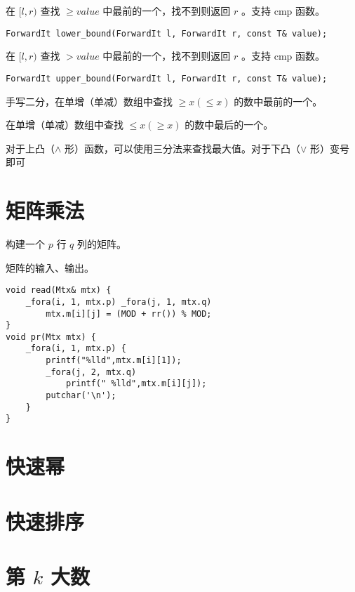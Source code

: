 在 $[l,r)$ 查找 $\geqslant value$ 中最前的一个，找不到则返回 $r$ 。支持 cmp 函数。

\begin{lstlisting}[style=cpp]
ForwardIt lower_bound(ForwardIt l, ForwardIt r, const T& value);
\end{lstlisting}

在 $[l,r)$ 查找 $> value$ 中最前的一个，找不到则返回 $r$ 。支持 cmp 函数。

\begin{lstlisting}[style=cpp]
ForwardIt upper_bound(ForwardIt l, ForwardIt r, const T& value);
\end{lstlisting}

手写二分，在单增（单减）数组中查找 $\geqslant x(\leqslant x)$ 的数中最前的一个。



在单增（单减）数组中查找 $\leqslant x(\geqslant x)$ 的数中最后的一个。



对于上凸（$\wedge$ 形）函数，可以使用三分法来查找最大值。对于下凸（$\vee$ 形）变号即可



\section{矩阵乘法}

构建一个 $p$ 行 $q$ 列的矩阵。



矩阵的输入、输出。

\begin{lstlisting}[style=cpp]
void read(Mtx& mtx) {
    _fora(i, 1, mtx.p) _fora(j, 1, mtx.q)
        mtx.m[i][j] = (MOD + rr()) % MOD;
}
void pr(Mtx mtx) {
    _fora(i, 1, mtx.p) {
        printf("%lld",mtx.m[i][1]);
        _fora(j, 2, mtx.q)
            printf(" %lld",mtx.m[i][j]);
        putchar('\n');
    }
}
\end{lstlisting}

\section{快速幂}





\section{快速排序}



\section{\texorpdfstring{第 $k$ 大数}{第 k 大数}}


